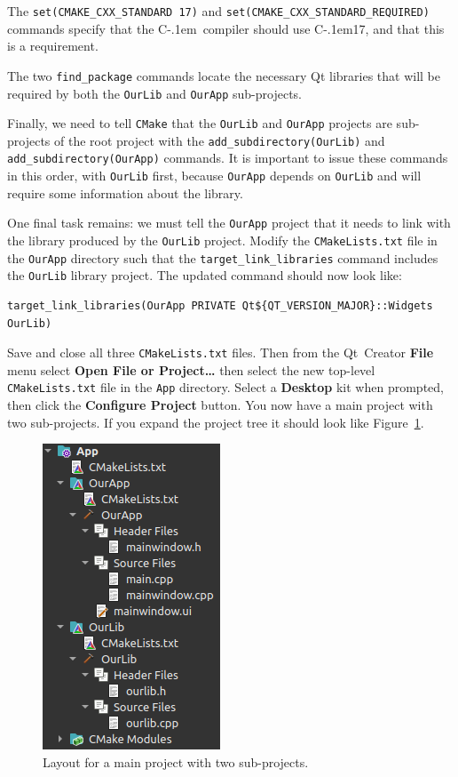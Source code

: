 \documentclass[letterpaper]{article}
\newcommand{\Cpp}{\mbox{C\kern-.1em\raisebox{.35ex}{\smaller{\smaller{+\kern-0.05em+}}}}}
\begin{document}
  The \verb|set(CMAKE_CXX_STANDARD 17)| and \verb|set(CMAKE_CXX_STANDARD_REQUIRED)|
  commands specify that the \Cpp\ compiler should use \Cpp17, and that this is a
  requirement.

  The two \verb|find_package| commands locate the necessary Qt libraries
  that will be required by both the \verb|OurLib| and \verb|OurApp| sub-projects.

  Finally, we need to tell \verb|CMake| that the \verb|OurLib| and \verb|OurApp| projects are sub-projects
  of the root project with the \verb|add_subdirectory(OurLib)| and \verb|add_subdirectory(OurApp)|
  commands. It is important to issue these commands in this order, with \verb|OurLib| first,
  because \verb|OurApp| depends on \verb|OurLib| and will require some information
  about the library.

  One final task remains: we must tell the \verb|OurApp| project that it needs to link
  with the library produced by the \verb|OurLib| project. Modify the \verb|CMakeLists.txt|
  file in the \verb|OurApp| directory such that the \verb|target_link_libraries| command
  includes the \verb|OurLib| library project. The updated command should now look like:
  \begin{lstlisting}
target_link_libraries(OurApp PRIVATE Qt${QT_VERSION_MAJOR}::Widgets OurLib)
  \end{lstlisting}

  Save and close all three \verb|CMakeLists.txt| files. Then from the Qt~Creator \textbf{File} menu
  select \textbf{Open File or Project\ldots} then select the new top-level \verb|CMakeLists.txt|
  file in the \verb|App| directory. Select a \textbf{Desktop} kit when prompted, then click the
  \textbf{Configure Project} button. You now have a main project with two sub-projects.
  If you expand the project tree it should look like Figure~\ref{fig:final_layout}.
  \begin{figure}[H]
    \centering
    \includegraphics{final_project_layout.png}
    \caption{Layout for a main project with two sub-projects.}
    \label{fig:final_layout}
  \end{figure}
\end{document}
